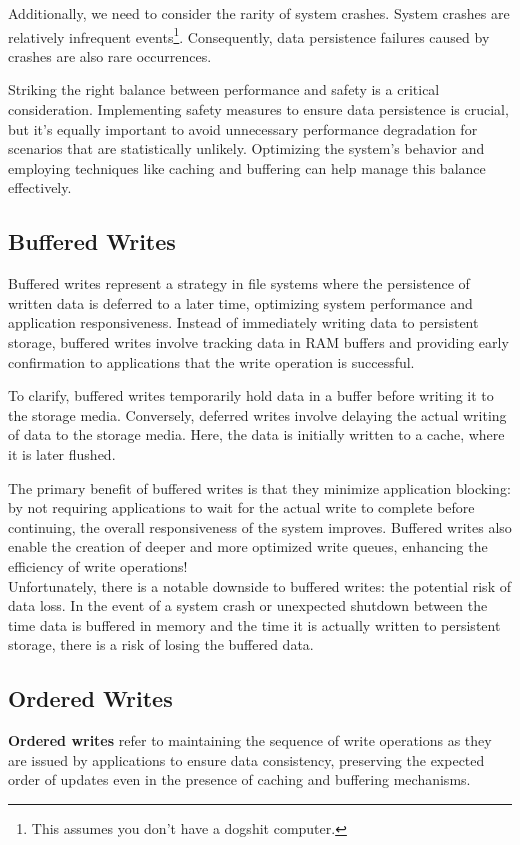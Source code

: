 \documentclass{report}
\newcommand{\definitionBegin}[1]{\begin{tcolorbox}[title={Definition: #1}]}
\newcommand{\definitionEnd}{\end{tcolorbox}}
\newcommand{\asideBegin}[1]{\begin{tcolorbox}[colback=orange!5!white,colframe=black!75!orange,title={Aside:
      #1}]}
\newcommand{\asideEnd}{\end{tcolorbox}}
\newcommand{\corollaryBegin}[1]{\begin{tcolorbox}[colback=teal!5!white,colframe=black!75!teal,title={Corollary:
      #1}]}
\newcommand{\corollaryEnd}{\end{tcolorbox}}
\begin{document}
Additionally, we need to consider the rarity of system crashes. System crashes are relatively
infrequent events\footnote{This assumes you don't have a dogshit computer.}. Consequently, data
persistence failures caused by crashes are also rare occurrences.

Striking the right balance between performance and safety is a critical consideration. Implementing
safety measures to ensure data persistence is crucial, but it's equally important to avoid
unnecessary performance degradation for scenarios that are statistically unlikely. Optimizing the
system's behavior and employing techniques like caching and buffering can help manage this balance
effectively.


\subsection{Buffered Writes}
Buffered writes represent a strategy in file systems where the persistence of written data is
deferred to a later time, optimizing system performance and application responsiveness. Instead of
immediately writing data to persistent storage, buffered writes involve tracking data in RAM buffers
and providing early confirmation to applications that the write operation is successful.

\asideBegin{Buffered v. Deferred Writes}
To clarify, buffered writes temporarily hold data in a buffer before writing it to the storage
media. Conversely, deferred writes involve delaying the actual writing of data to the storage
media. Here, the data is initially written to a cache, where it is later flushed.
\asideEnd

\corollaryBegin{Benefits and Issues}
The primary benefit of buffered writes is that they minimize application blocking: by not requiring
applications to wait for the actual write to complete before continuing, the overall responsiveness
of the system improves. Buffered writes also enable the creation of deeper and more optimized write
queues, enhancing the efficiency of write operations! \\

Unfortunately, there is a notable downside to buffered writes: the potential risk of data loss. In the
event of a system crash or unexpected shutdown between the time data is buffered in memory and the
time it is actually written to persistent storage, there is a risk of losing the buffered data.
\corollaryEnd


\subsection{Ordered Writes}
\definitionBegin{Ordered Write}
\textbf{Ordered writes} refer to maintaining the sequence of write operations as they are issued by
applications to ensure data consistency, preserving the expected order of updates even in the
presence of caching and buffering mechanisms.
\definitionEnd
\end{document}
